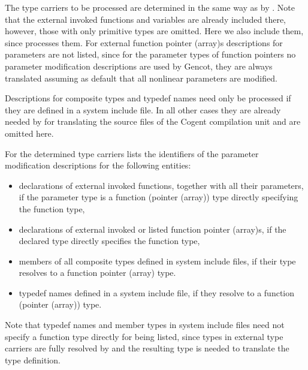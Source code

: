 The type carriers to be processed are determined in the same way as by . Note that the 
external invoked functions and variables are already included there, however, those with only primitive types are omitted.
Here we also include them, since  processes them. 
For external function pointer (array)s descriptions for parameters are not listed, since
for the parameter types of function pointers no parameter modification descriptions are used by Gencot, they
are always translated assuming as default that all nonlinear parameters are modified.

Descriptions for composite types and typedef names need only be processed if they are defined in a system include
file. In all other cases they are already needed by  for translating the source files
of the Cogent compilation unit and are omitted here.

For the determined type carriers  lists the identifiers of 
the parameter modification descriptions for the following entities:
\begin{itemize}
\item declarations of external invoked functions, together with all their parameters, if the parameter
type is a function (pointer (array)) type directly specifying the function type,
\item declarations of external invoked or listed function pointer (array)s, if the declared type directly specifies
the function type,
\item members of all composite types defined in system include files, if their type resolves to a function pointer (array) type.
\item typedef names defined in a system include file, if they resolve to a function (pointer (array)) type.
\end{itemize}

Note that typedef names and member types in system include files need not specify a function type directly for being listed, 
since types in external type carriers are fully resolved by  and the resulting type is needed to translate 
the type definition.
